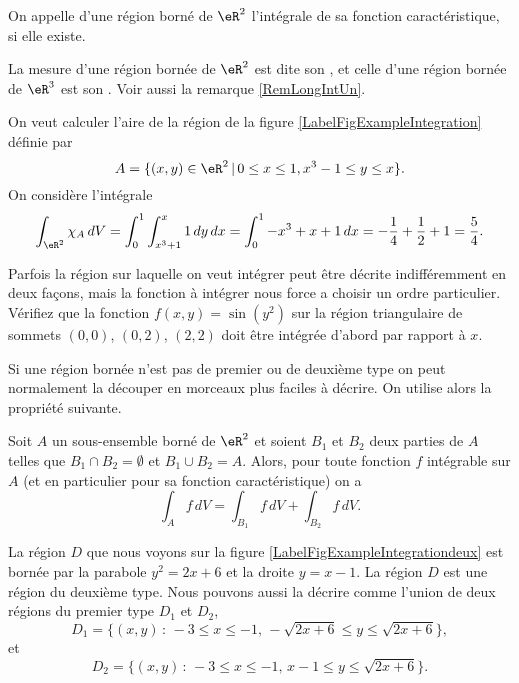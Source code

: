 \begin{definition}		\label{DefMesureInt}
	On appelle  d'une région borné de  $\eR^2$  l'intégrale de sa fonction caractéristique, si elle existe.  
\end{definition}
La mesure d'une région bornée de $\eR^2$ est dite son , et celle d'une région bornée de $\eR^3$ est son . Voir aussi la remarque \ref{RemLongIntUn}.


\begin{example}\label{exint}
  On veut calculer l'aire de la région de la figure \ref{LabelFigExampleIntegration} définie par 
\[
A=\{(x,y)\in\eR^2\,\vert\, 0\leq x\leq 1, x^3-1\leq y\leq x \}.
\]
On considère l'intégrale 
\[
\int_{\eR^2} \chi_{A}\, dV= \int_0^1\int^{x}_{x^3+1} 1 \, dy\, dx= \int_0^1 -x^3+x+1\, dx= -\frac{1}{4}+\frac{1}{2}+1=\frac{5}{4}.
\]
\end{example}
\newcommand{\CaptionFigExampleIntegration}{La région $A$ de l'exemple \ref{exint}}


\begin{exercice}

  Parfois la région sur laquelle on veut intégrer peut être décrite indifféremment en deux façons, mais la fonction à intégrer nous force a choisir un ordre particulier. Vérifiez que la fonction $f(x,y)=\sin(y^2)$ sur la région triangulaire de sommets $(0,0)$, $(0, 2)$, $(2,2)$ doit être intégrée d'abord par rapport à $x$.     
\end{exercice}

Si une région bornée n'est pas de premier ou de deuxième type on peut normalement la découper en morceaux plus faciles à décrire. On utilise alors la propriété suivante. 
\begin{lemma}
  Soit $A$ un sous-ensemble borné de $\eR^2$ et soient $B_1$ et $B_2$ deux parties de $A$ telles que $B_1\cap B_2=\emptyset$ et $B_1\cup B_2= A$. Alors, pour toute fonction $f$ intégrable sur $A$ (et en particulier pour sa fonction caractéristique) on a
\[
\int_{A}f \, dV= \int_{B_1}f \, dV+\int_{B_2}f \, dV.
\] 
\end{lemma}

\begin{example}\label{exint2}
La région $D$ que nous voyons sur la figure \ref{LabelFigExampleIntegrationdeux} est bornée par la parabole $y^2=2x+6$ et la droite $y=x-1$. La région $D$ est une région du deuxième type. Nous pouvons aussi la décrire comme l'union de deux régions du premier type $D_1$ et $D_2$,
\[
D_1=\{(x,y)\,:\, -3\leq x \leq -1,\, -\sqrt{2x+6}\leq y \leq \sqrt{2x+6}\},
\]
 et 
\[
D_2=\{(x,y)\,:\, -3\leq x \leq -1, \, x-1\leq y \leq \sqrt{2x+6}\}.
\]
\newcommand{\CaptionFigExampleIntegrationdeux}{La région $D$ de l'exemple \ref{exint2}}

\end{example}

